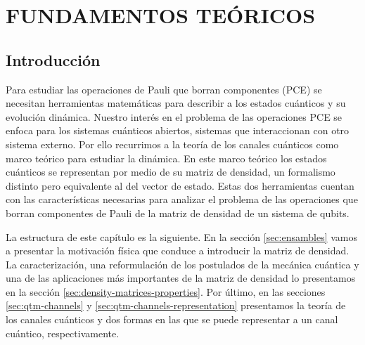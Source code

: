 \chapter{FUNDAMENTOS TEÓRICOS}

\section{Introducción}

Para estudiar las operaciones de Pauli que borran componentes (PCE)
se necesitan herramientas matemáticas para describir a los estados 
cuánticos y su evolución dinámica. Nuestro
interés en el problema de 
las operaciones PCE se enfoca para los sistemas cuánticos abiertos, 
sistemas que interaccionan con otro sistema externo. Por ello recurrimos
a la teoría de los canales cuánticos como marco teórico para estudiar 
la dinámica. En este marco teórico los estados cuánticos se representan
por medio de su matriz de densidad, un formalismo distinto pero equivalente
al del vector de estado. Estas dos herramientas cuentan con las características 
necesarias para analizar el problema de las operaciones que borran
componentes de Pauli de la matriz de densidad de un sistema de qubits.

La estructura de este capítulo es la siguiente. En la sección \ref{sec:ensambles}
vamos a presentar la motivación física que conduce a introducir
la matriz de densidad. La caracterización, una reformulación de los 
postulados de la mecánica cuántica y una de las aplicaciones más 
importantes de la matriz de densidad lo presentamos en la sección
\ref{sec:density-matrices-properties}. Por último, 
en las secciones \ref{sec:qtm-channels}
y \ref{sec:qtm-channels-representation} presentamos la teoría de los
canales cuánticos y dos formas en las que se puede representar
a un canal cuántico, respectivamente.

